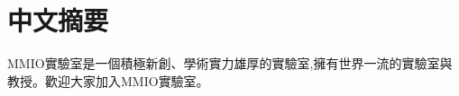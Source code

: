 \chapter{中文摘要}
\label{ch:abstract_chinese}

\gls{MMIO}實驗室是一個積極新創、學術實力雄厚的實驗室,擁有世界一流的實驗室與教授。歡迎大家加入\gls{MMIO}實驗室。
